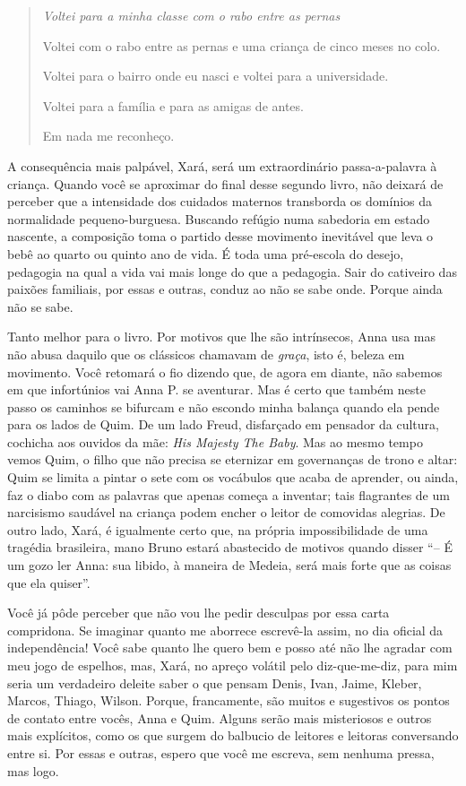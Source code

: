 \begin{quote}
\emph{Voltei para a minha classe com o rabo entre as pernas}

Voltei com o rabo entre as pernas e uma criança de cinco meses no colo.

Voltei para o bairro onde eu nasci e voltei para a universidade.

Voltei para a família e para as amigas de antes.

Em nada me reconheço.
\end{quote}

A consequência mais palpável, Xará, será um extraordinário
passa-a-palavra à criança. Quando você se aproximar do final desse
segundo livro, não deixará de perceber que a intensidade dos cuidados
maternos transborda os domínios da normalidade pequeno-burguesa.
Buscando refúgio numa sabedoria em estado nascente, a composição toma o
partido desse movimento inevitável que leva o bebê ao quarto ou quinto
ano de vida. É toda uma pré-escola do desejo, pedagogia na qual a vida
vai mais longe do que a pedagogia. Sair do cativeiro das paixões
familiais, por essas e outras, conduz ao não se sabe onde. Porque ainda
não se sabe.

Tanto melhor para o livro. Por motivos que lhe são intrínsecos, Anna usa
mas não abusa daquilo que os clássicos chamavam de \emph{graça}, isto é,
beleza em movimento. Você retomará o fio dizendo que, de agora em
diante, não sabemos em que infortúnios vai Anna P. se aventurar. Mas é
certo que também neste passo os caminhos se bifurcam e não escondo minha
balança quando ela pende para os lados de Quim. De um lado Freud,
disfarçado em pensador da cultura, cochicha aos ouvidos da mãe:
\emph{His Majesty The Baby}. Mas ao mesmo tempo vemos Quim, o filho que
não precisa se eternizar em governanças de trono e altar: Quim se limita
a pintar o sete com os vocábulos que acaba de aprender, ou ainda, faz o
diabo com as palavras que apenas começa a inventar; tais flagrantes de
um narcisismo saudável na criança podem encher o leitor de comovidas
alegrias. De outro lado, Xará, é igualmente certo que, na própria
impossibilidade de uma tragédia brasileira, mano Bruno estará abastecido
de motivos quando disser ``-- É um gozo ler Anna: sua libido, à maneira
de Medeia, será mais forte que as coisas que ela quiser''.

Você já pôde perceber que não vou lhe pedir desculpas por essa carta
compridona. Se imaginar quanto me aborrece escrevê-la assim, no dia
oficial da independência! Você sabe quanto lhe quero bem e posso até não
lhe agradar com meu jogo de espelhos, mas, Xará, no apreço volátil pelo
diz-que-me-diz, para mim seria um verdadeiro deleite saber o que pensam
Denis, Ivan, Jaime, Kleber, Marcos, Thiago, Wilson. Porque, francamente,
são muitos e sugestivos os pontos de contato entre vocês, Anna e Quim.
Alguns serão mais misteriosos e outros mais explícitos, como os que
surgem do balbucio de leitores e leitoras conversando entre si. Por
essas e outras, espero que você me escreva, sem nenhuma pressa, mas
logo.

